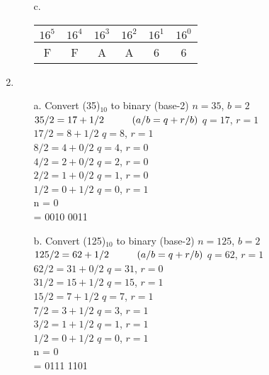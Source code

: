 \begin{enumerate}
\begin{itemize}
            \item[c.]   
                    \begin{tabular}{ | c | c | c | c | c | c | }
                        \hline
                        $16^{5}$ &
                        $16^{4}$ &
                        $16^{3}$ &
                        $16^{2}$ &
                        $16^{1}$ &
                        $16^{0}$
                        \\ \hline
                        {F}{} &
                        {F}{} &
                        {A}{} &
                        {A}{} &
                        {6}{} &
                        {6}{}
                        \\ \hline
                    \end{tabular}
        \end{itemize}

    \item
        \begin{itemize}
            \item[a.]   Convert (35)$_{10}$ to binary (base-2)
                    \tab $n = 35$, $b = 2$
                        ~\\
                        $35/2 = 17 + 1/2 \hspace*{1cm} (a/b = q + r/b)$ \tab[1cm] $q = 17$, $r = 1$ \\
                        $17/2 = 8 + 1/2 $ \tab[5cm] $q = 8$, $r = 1$ \\
                        $8/2 = 4 + 0/2$ \tab[5.2cm] $q = 4$, $r = 0$ \\
                        $4/2 = 2 + 0/2$ \tab[5.2cm] $q = 2$, $r = 0$ \\
                        $2/2 = 1 + 0/2$ \tab[5.2cm] $q = 1$, $r = 0$ \\
                        $1/2 = 0 + 1/2$ \tab[5.2cm] $q = 0$, $r = 1$ \\
                        n = 0 \\
                        = 0010 0011
            \item[b.]   Convert (125)$_{10}$ to binary (base-2)
                    \tab $n = 125$, $b = 2$
                        ~\\
                        $125/2 = 62 + 1/2 \hspace*{1cm} (a/b = q + r/b)$ \tab[1cm] $q = 62$, $r = 1$ \\
                        $62/2 = 31 + 0/2 $ \tab[5cm] $q = 31$, $r = 0$ \\
                        $31/2 = 15 + 1/2 $ \tab[5cm] $q = 15$, $r = 1$ \\
                        $15/2 = 7 + 1/2 $ \tab[5.2cm] $q = 7$, $r = 1$ \\
                        $7/2 = 3 + 1/2 $ \tab[5.4cm] $q = 3$, $r = 1$ \\
                        $3/2 = 1 + 1/2 $ \tab[5.4cm] $q = 1$, $r = 1$ \\
                        $1/2 = 0 + 1/2 $ \tab[5.4cm] $q = 0$, $r = 1$ \\
                        n = 0 \\
                        = 0111 1101
        \end{itemize}


\end{enumerate}

